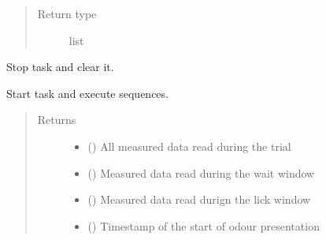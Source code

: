 \documentclass[letterpaper,10pt,english]{sphinxmanual}
\begin{document}
\begin{fulllineitems}
\begin{fulllineitems}
\begin{quote}
\begin{description}
\item[{Return type}] \leavevmode
\sphinxAtStartPar
list

\end{description}\end{quote}

\end{fulllineitems}


\begin{fulllineitems}
\label{\detokenize{NoSeMazeController/daqface:daqface.DAQ.DoAiMultiTask.ClearTasks}}
\pysigstartsignatures
{}
\pysigstopsignatures
\sphinxAtStartPar
Stop task and clear it.

\end{fulllineitems}


\begin{fulllineitems}
\label{\detokenize{NoSeMazeController/daqface:daqface.DAQ.DoAiMultiTask.DoTask}}
\pysigstartsignatures
{}
\pysigstopsignatures
\sphinxAtStartPar
Start task and execute sequences.
\begin{quote}\begin{description}
\item[{Returns}] \leavevmode
\sphinxAtStartPar
\begin{itemize}
\item {} 
\sphinxAtStartPar
{} () \textendash{} All measured data read during the trial

\item {} 
\sphinxAtStartPar
{} () \textendash{} Measured data read during the wait window

\item {} 
\sphinxAtStartPar
{} () \textendash{} Measured data read durign the lick window

\item {} 
\sphinxAtStartPar
{} () \textendash{} Timestamp of the start of odour presentation


\end{itemize}
\end{description}
\end{quote}
\end{fulllineitems}
\end{fulllineitems}
\end{document}
